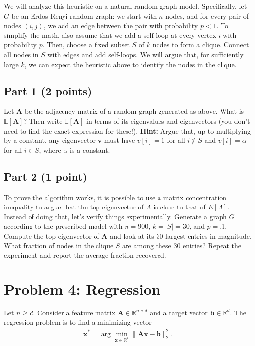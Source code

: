 \documentclass{article}
\begin{document}
We will analyze this heuristic on a natural random graph model. Specifically, let $G$ be an Erdos-Renyi random graph: we start with $n$ nodes, and for every pair of nodes $(i,j)$, we add an edge between the pair with probability $p < 1$. To simplify the math, also assume that we add a self-loop at every vertex $i$ with probability $p$. Then, choose a fixed subset $S$ of $k$ nodes to form a clique. Connect all nodes in $S$ with edges and add self-loops. We will argue that, for sufficiently large $k$, we can expect the heuristic above to identify the nodes in the clique. 

\subsection*{Part 1 (2 points)}
Let $\mathbf{A}$ be the adjacency matrix of a random graph generated as above.
What is $\mathbb{E}[\mathbf{A}]$?
Then write $\mathbb{E}[\mathbf{A}]$ in terms of its eigenvalues and eigenvectors (you don't need to find the exact expression for these!).
\textbf{Hint:} Argue that, up to multiplying by a constant, any eigenvector $\mathbf{v}$ must have $v[i] = 1$ for all $i \notin S$ and $v[i] = \alpha$ for all $i\in S$, where $\alpha$ is a constant.

\subsection*{Part 2 (1 point)}
To prove the algorithm works, it is possible to use a matrix concentration inequality to argue that the top eigenvector of $A$ is close to that of $E[A]$. Instead of doing that, let's verify things experimentally. Generate a graph $G$ according to the prescribed model with $n = 900$, $k = 
|S|= 30$, and $p = .1$. Compute the top eigenvector of $\mathbf{A}$ and look at its 30 largest
entries in magnitude. What fraction of nodes in the clique $S$ are among these 30 entries? Repeat the experiment and report the average fraction recovered. 

%

\newpage

\section*{Problem 4: Regression}

Let $n \geq d$.
Consider a feature matrix $\mathbf{A} \in \mathbb{R}^{n \times d}$ and a target vector $\mathbf{b} \in \mathbb{R}^d$.
The regression problem is to find a minimizing vector
\begin{align*}
\mathbf{x}^* = \arg \min_{\mathbf{x} \in \mathbb{R}^d}
\| \mathbf{Ax} - \mathbf{b} \|_2^2.
\end{align*}
\end{document}
